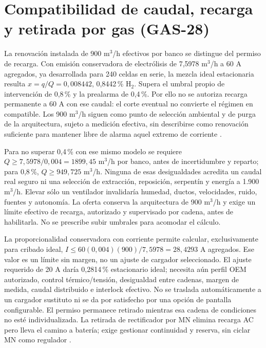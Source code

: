 \section{Compatibilidad de caudal, recarga y retirada por gas (GAS-28)}
\label{sec:sd4-integracion-gas28}
La renovación instalada de 900 m$^3$/h efectivos por banco se distingue del permiso de recarga. Con emisión conservadora de electrólisis de 7,5978 m$^3$/h a 60 A agregados, ya desarrollada para 240 celdas en serie, la mezcla ideal estacionaria resulta $x=q/Q=0,008442$, 0,8442\,\% H$_2$. Supera el umbral propio de intervención de 0,8\,\% y la prealarma de 0,4\,\%. Por ello no se autoriza recarga permanente a 60 A con ese caudal: el corte eventual no convierte el régimen en compatible. Los 900 m$^3$/h siguen como punto de selección ambiental y de purga de la arquitectura, sujeto a medición efectiva, sin describirse como renovación suficiente para mantener libre de alarma aquel extremo de corriente \parencites{p7-eaton-93t-guia}{csbManualJunio2025}{nistCODATA2022}.

Para no superar 0,4\,\% con ese mismo modelo se requiere $Q\geq7,5978/0,004=1899,45$ m$^3$/h por banco, antes de incertidumbre y reparto; para 0,8\,\%, $Q\geq949,725$ m$^3$/h. Ninguna de esas desigualdades acredita un caudal real seguro ni una selección de extracción, reposición, serpentín y energía a 1.900 m$^3$/h. Elevar sólo un ventilador invalidaría humedad, ductos, velocidades, ruido, fuentes y autonomía. La oferta conserva la arquitectura de 900 m$^3$/h y exige un límite efectivo de recarga, autorizado y supervisado por cadena, antes de habilitarla. No se prescribe subir umbrales para acomodar el cálculo.

La proporcionalidad conservadora con corriente permite calcular, exclusivamente para cribado ideal, $I\leq60(0,004)(900)/7,5978=28,4293$ A agregados. Ese valor es un límite sin margen, no un ajuste de cargador seleccionado. El ajuste requerido de 20 A daría 0,2814\,\% estacionario ideal; necesita aún perfil OEM autorizado, control térmico/tensión, desigualdad entre cadenas, margen de medida, caudal distribuido e interlock efectivo. No se traslada automáticamente a un cargador sustituto ni se da por satisfecho por una opción de pantalla configurable. El permiso permanece retirado mientras esa cadena de condiciones no esté individualizada. La retirada de rectificador por MN elimina recarga AC pero lleva el camino a batería; exige gestionar continuidad y reserva, sin ciclar MN como regulador \parencites{p7-eaton-93t-guia}{csbHRL12540WRA260131}.

